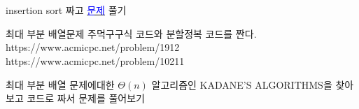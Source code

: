 \usepackage{oblivior}



   \section{}
   
   insertion sort 짜고 \href{https://www.acmicpc.net/problem/2750}{\textcolor{blue}{문제}} 풀기

   최대 부분 배열문제 주먹구구식 코드와 분할정복 코드를 짠다.
   https://www.acmicpc.net/problem/1912
   https://www.acmicpc.net/problem/10211

   최대 부분 배열 문제에대한 $\Theta(n)$ 알고리즘인 KADANE'S ALGORITHMS을 찾아보고 코드로 짜서 문제를 풀어보기
   
